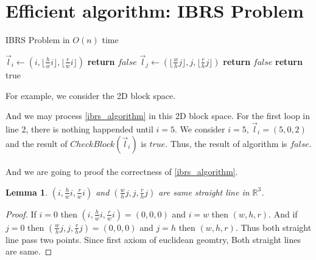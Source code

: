 \documentclass{article}
\newtheorem{lemma}{Lemma}
\begin{document}
\section{Efficient algorithm: IBRS Problem}
\begin{algorithm}
    \caption{IBRS Problem in $O(n)$ time}\label{ibrs_algorithm}
    \begin{algorithmic}[1]
                \State $\vec{l}_{i} \gets (i,\lfloor \frac{h}{w} i \rfloor,\lfloor \frac{r}{w} i \rfloor)$
                    \State \textbf{return} $false$
                \EndIf
            \EndFor
                \State $\vec{l}_{j} \gets (\lfloor \frac{w}{h} j \rfloor,j,\lfloor \frac{r}{h} j \rfloor)$
                    \State \textbf{return} $false$
                \EndIf
            \EndFor
            \State \textbf{return} true
        \EndProcedure
    \end{algorithmic}
\end{algorithm}
For example, we consider the 2D block space. \\
\begin{center}
\end{center}
And we may process \cref{ibrs_algorithm} in this 2D block space.
For the first loop in line 2, there is nothing happended until $i=5$.
We consider $i=5$, $\vec{l}_{i} = (5, 0, 2)$ and the result of $CheckBlock(\vec{l}_{i})$ is $true$.
Thus, the result of algorithm is $false$. \\ \\
And we are going to proof the correctness of \cref{ibrs_algorithm}.
\begin{lemma}
    \label{lem1}
    $(i,\frac{h}{w} i,\frac{r}{w} i)$ and $(\frac{w}{h} j,j,\frac{r}{h} j)$ are same straight line in $\mathbb{R}^{3}$.
\end{lemma}
\begin{proof}
    If $i=0$ then $(i,\frac{h}{w} i,\frac{r}{w} i)=(0,0,0)$ 
    and $i=w$ then $(w, h, r)$.
    And if $j=0$ then $(\frac{w}{h} j,j,\frac{r}{h} j)=(0,0,0)$
    and $j=h$ then $(w,h,r)$.
    Thus both straight line pass two points.
    Since first axiom of euclidean geomtry, Both straight lines are same.
\end{proof}
\end{document}
